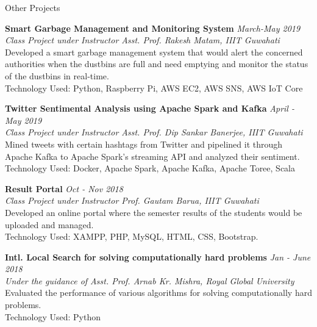 \documentclass{resume} %
\begin{document}
\begin{rSection}{Other Projects}

{\bf Smart Garbage Management and Monitoring System}
\hfill {\em March-May 2019}
\\{\em Class Project under Instructor Asst. Prof. Rakesh Matam, IIIT Guwahati}
\\Developed a smart garbage management system that would alert the concerned authorities when the dustbins are full and need emptying and monitor the status of the dustbins in real-time. 
\\{Technology Used: }Python, Raspberry Pi, AWS EC2, AWS SNS, AWS IoT Core \par


{\bf Twitter Sentimental Analysis using Apache Spark and Kafka}
\hfill {\em April - May 2019}
\\{\em Class Project under Instructor Asst. Prof. Dip Sankar Banerjee, IIIT Guwahati}
\\Mined tweets with certain hashtags from Twitter and pipelined it through Apache Kafka to Apache Spark's streaming API and analyzed their sentiment.
\\{Technology Used: }Docker, Apache Spark, Apache Kafka, Apache Toree, Scala \par

{\bf Result Portal}
\hfill {\em Oct - Nov 2018}
\\{\em Class Project under Instructor Prof. Gautam Barua, IIIT Guwahati}
\\Developed an online portal where the semester results of the students would be uploaded and managed.
\\
{ Technology Used: }XAMPP, PHP, MySQL, HTML, CSS, Bootstrap.\par

{\bf Intl. Local Search for solving computationally hard problems}
\hfill {\em Jan - June 2018}
\\{\em Under the guidance of Asst. Prof. Arnab Kr. Mishra, Royal Global University }
\\Evaluated the performance of various algorithms
for solving computationally hard problems.
\\{ Technology Used: }Python \par


\end{rSection}



\end{document}

